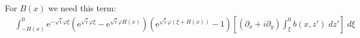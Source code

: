 \documentclass[10pt]{amsart}
\begin{document}
For $B(x)$ we need this term:
 \begin{align}
& \int_{-H(x)}^{0} 
\mathrm{e}^{-\sqrt{i} \varphi \xi} 
\left(
\mathrm{e}^{\sqrt{i} \varphi \xi} - 
\mathrm{e}^{\sqrt{i} \varphi H(x)} 
\right) \left(
\mathrm{e}^{\sqrt{i} \varphi  \left( \xi + H(x) \right)} - 1
\right)
 \left[ \left( \partial_x + i \partial_y \right) \int_{\xi}^{0} b(x,z') \; dz'  \right] \; d \xi   \nonumber  \\

\end{align}
\end{document}
